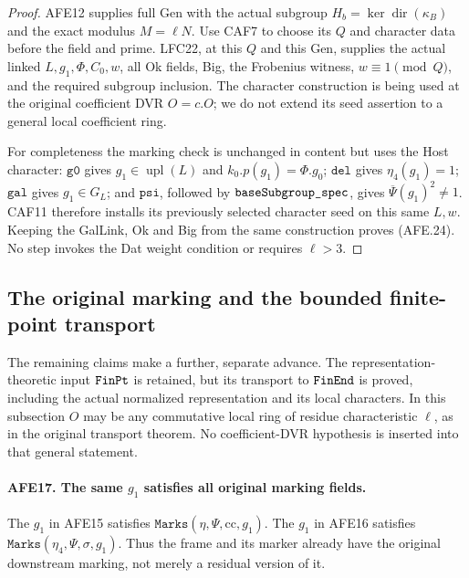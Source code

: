 \documentclass[11pt,a4paper]{article}
\numberwithin{equation}{section}
\theoremstyle{remark}\newtheorem{remark}[theorem]{Remark}
\begin{document}
\begin{proof}
AFE12 supplies full Gen with the actual subgroup
\(H_b=\ker\operatorname{dir}(\kappa_B)\) and
the exact modulus \(M=\ell N\).
Use CAF7 to choose its \(Q\) and character data
before the field and prime.
LFC22, at this \(Q\) and this Gen, supplies
the actual linked \(L,g_1,\Phi,C_0,w\), all Ok
fields, Big, the Frobenius witness,
\(w\equiv1\pmod Q\), and the required subgroup
inclusion.  The character construction is being
used at the original coefficient DVR \(O=c.O\);
we do not extend its seed assertion to a general
local coefficient ring.

For completeness the marking check is unchanged
in content but uses the Host character:
\(\texttt{g0}\) gives \(g_1\in\operatorname{upl}(L)\)
and \(k_0.p(g_1)=\Phi.g_0\);
\(\texttt{del}\) gives \(\eta_4(g_1)=1\);
\(\texttt{gal}\) gives \(g_1\in G_L\);
and \(\texttt{psi}\), followed by
\(\texttt{base\allowbreak Subgroup\_\allowbreak spec}\), gives
\(\overline\Psi(g_1)^2\ne1\).
CAF11 therefore installs its previously selected
character seed on this same \(L,w\).
Keeping the GalLink, Ok and Big from the same
construction proves (AFE.24).
No step invokes the Dat weight condition or
requires \(\ell>3\).
\end{proof}

\subsection{The original marking and the bounded finite-point transport}

The remaining claims make a further, separate advance.
The representation-theoretic input \(\texttt{Fin\allowbreak Pt}\)
is retained, but its transport to \(\texttt{Fin\allowbreak End}\)
is proved, including the actual normalized representation
and its local characters.  In this subsection \(O\) may
be any commutative local ring of residue characteristic
\(\ell\), as in the original transport theorem.
No coefficient-DVR hypothesis is inserted into that
general statement.

\paragraph{AFE17. The same \(g_1\) satisfies all original marking fields.}
\label{claim:AFE17}
The \(g_1\) in AFE15 satisfies
\(\texttt{Marks}(\eta,\Psi,\mathrm{cc},g_1)\).
The \(g_1\) in AFE16 satisfies
\(\texttt{Marks}(\eta_4,\Psi,\sigma,g_1)\).
Thus the frame and its marker already have the
original downstream marking, not merely a residual
version of it.
\end{document}

